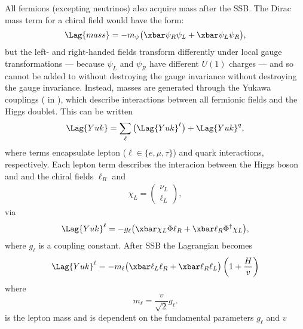 All fermions (excepting neutrinos) also acquire mass after the SSB.
The Dirac mass term for a chiral field would have the form:
\begin{equation}
  \Lag{mass} = -m_\psi\big(\xbar\psi_R\psi_L + \xbar\psi_L\psi_R\big),
\end{equation}
but the left- and right-handed fields
transform differently under local gauge transformations
--- because $\psi_L$ and $\psi_R$ have different $U(1)$ charges ---
and so cannot be added to  without destroying the gauge invariance without destroying the
gauge invariance.
Instead, masses are generated through the Yukawa couplings ( in ), which
describe interactions between all fermionic fields and the Higgs doublet.
This can be written
\begin{equation}
  \Lag{Yuk} = \sum_{\ell}\big(\Lag{Yuk}^\ell\big) + \Lag{Yuk}^q,
  \label{eq:th:yukking}
\end{equation}
where terms encapsulate lepton ($\ell\in\{e,\mu,\tau\}$) and quark interactions, respectively.
Each lepton term describes the interacion between the Higgs boson and and the chiral fields
$\ell_R$ and
\begin{align}
  \chi_L = \begin{pmatrix}\nu_L \\ \ell_L \end{pmatrix},
\end{align}
via
\begin{equation}
  \Lag{Yuk}^\ell
  = - g_\ell\big(\xbar\chi_L\Phi \ell_R + \xbar \ell_R\Phi^\dagger\chi_L\big),
\end{equation}
where $g_\ell$ is a coupling constant.
After SSB the Lagrangian becomes
\begin{align}
  \Lag{Yuk}^\ell
  = - m_\ell \big(\xbar\ell_L\ell_R + \xbar\ell_R\ell_L\big)%
  \left(1 + \frac{H}{v}\right)
\end{align}
where
\begin{equation}
  m_\ell = \frac{v}{\sqrt{2}}g_\ell.
  \label{eq:leptonmass}
\end{equation}
is the lepton mass and is dependent on the fundamental \sm parameters $g_\ell$ and $v$

